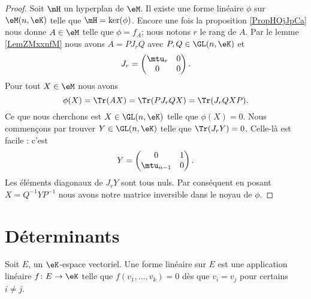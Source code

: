 \begin{proof}
    Soit \( \mH\) un hyperplan de \( \eM\). Il existe une forme linéaire \( \phi\) sur \( \eM(n,\eK)\) telle que \( \mH=\ker(\phi)\). Encore une fois la proposition \ref{PropHOjJpCa} nous donne \( A\in \eM\) telle que \( \phi=f_A\); nous notons \( r\) le rang de \( A\). Par le lemme \ref{LemZMxxnfM} nous avons \( A=PJ_rQ\) avec \( P,Q\in \GL(n,\eK)\) et
    \begin{equation}
        J_r=\begin{pmatrix}
            \mtu_r    &   0    \\ 
            0    &   0    
        \end{pmatrix}.
    \end{equation}
    Pour tout \( X\in \eM\) nous avons
    \begin{equation}
        \phi(X)=\Tr(AX)=\Tr(PJ_rQX)=\Tr(J_rQXP).
    \end{equation}
    Ce que nous cherchons est \( X\in \GL(n,\eK)\) telle que \( \phi(X)=0\). Nous commençons par trouver \( Y\in\GL(n,\eK)\) telle que \( \Tr(J_rY)=0\). Celle-là est facile : c'est
    \begin{equation}
        Y=\begin{pmatrix}
            0    &   1    \\ 
            \mtu_{n-1}    &   0    
        \end{pmatrix}.
    \end{equation}
    Les éléments diagonaux de \( J_rY\) sont tous nuls. Par conséquent en posant \( X=Q^{-1}YP^{-1}\) nous avons notre matrice inversible dans le noyau de \( \phi\).
\end{proof}

\section{Déterminants}
\label{SecGYzHWs}



\begin{definition}
    Soit \( E\), un \( \eK\)-espace vectoriel. Une forme linéaire  sur \( E\) est une application linéaire \( f\colon E\to \eK\) telle que \( f(v_1,\ldots, v_k)=0\) dès que \( v_i=v_j\) pour certains \( i\neq j\).
\end{definition}

